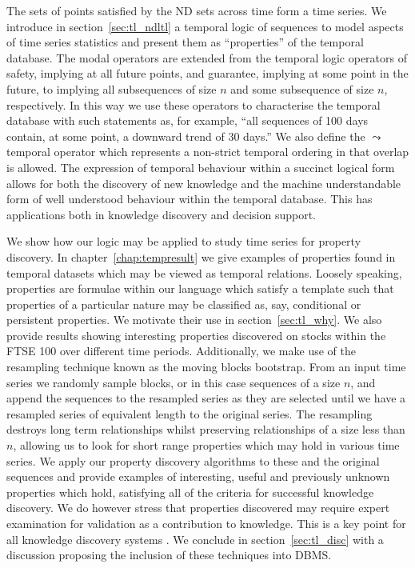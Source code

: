 \smallskip

The sets of points satisfied by the ND sets across time form a time
series. We introduce in section~\ref{sec:tl_ndltl} a temporal logic of
sequences to model aspects of
time series statistics and present them as ``properties'' of the
temporal database. The modal operators are extended from the temporal
logic operators of safety, implying at all future points, and
guarantee, implying at some point in the future, to implying all
subsequences of size $n$ and some subsequence of size $n$, respectively.  
In this way we use these operators to characterise
the temporal database with such statements as, for example, ``all
sequences of 100 days contain, at some point, a downward trend of 30
days.''  We also define the $\leadsto$ temporal operator which
represents a non-strict temporal ordering in that overlap is allowed.
The expression of temporal behaviour within a succinct logical
form allows for both the discovery of new knowledge and the machine
understandable form of well understood behaviour within the temporal
database. 
This has applications both in knowledge discovery and
decision support. 
\smallskip

We show how our logic may be applied to study time series for
property discovery. In chapter~\ref{chap:tempresult} we give examples
of properties found in temporal
datasets which may be viewed as temporal relations. Loosely speaking,
properties are formulae within our language which satisfy a template
such that properties of a particular nature may be classified as, say,
conditional or persistent properties. We motivate their use in
section~\ref{sec:tl_why}. 
We also provide
results showing interesting properties
discovered on stocks within the FTSE 100 over different
time periods. Additionally, we make use of the resampling technique
known as the moving blocks bootstrap. From an input time series we
randomly sample blocks, or in this case sequences of a size $n$, and
append the sequences to the resampled series as they are selected
until we have a resampled series of equivalent length to the original
series.  
The resampling destroys long term relationships whilst preserving
relationships of a size less than $n$, allowing us to
look for short range properties which may hold in various time series.
We apply our property discovery
algorithms to these and the original sequences and provide examples of
interesting,
useful and previously unknown properties which hold, satisfying all of
the criteria for successful knowledge discovery. We do however stress
that properties discovered may 
require expert examination for validation as a contribution to
knowledge. This is a key point for all knowledge discovery systems
\cite{fps96,man97}. We conclude in
section~\ref{sec:tl_disc} with a
discussion proposing the inclusion of these techniques into DBMS.


